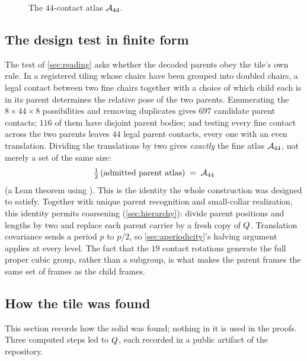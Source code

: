 \begin{figure}[ht]
  \centering
  {\footnotesize}
  \caption{The $44$-contact atlas $\mathcal{A}_{44}$.}
  \label{fig:atlas}
\end{figure}

\subsection{The design test in finite form}\label{sec:designtest}

The test of \cref{sec:reading} asks whether the decoded parents obey the tile's own rule. In a
registered tiling whose chairs have been grouped into doubled chairs, a legal contact between two
fine chairs together with a choice of which child each is in its parent determines the relative
pose of the two parents. Enumerating the $8\times44\times8$ possibilities and removing duplicates
gives $697$ candidate parent contacts; $116$ of them have disjoint parent bodies; and testing every
fine contact across the two parents leaves $44$ legal parent contacts, every one with an even
translation. Dividing the translations by two gives \emph{exactly} the fine atlas $\mathcal{A}_{44}$, not
merely a set of the same size:
\[
  \tfrac12\,(\text{admitted parent atlas}) \;=\; \mathcal{A}_{44}
\]
(a Lean theorem using ). This is the identity the whole construction was
designed to satisfy. Together with unique parent recognition and small-collar realization, this
identity permits coarsening (\cref{sec:hierarchy}): divide parent positions and lengths by two
and replace each parent carrier by a fresh copy of $Q$. Translation covariance sends a period
$p$ to $p/2$, so \cref{sec:aperiodicity}'s halving argument applies at every level. The fact that
the $19$ contact
rotations generate the full proper cubic group, rather than a subgroup, is what makes the parent
frames the same set of frames as the child frames.

\subsection{How the tile was found}\label{sec:found}

This section records how the solid was found; nothing in it is used in the proofs. Three
computed steps led to $Q$, each recorded in a public artifact of the repository.

